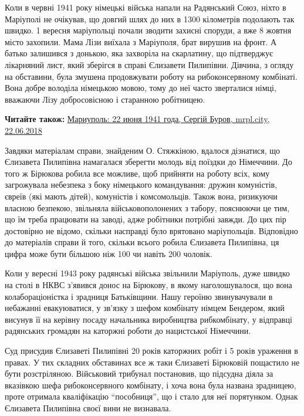 Коли в червні 1941 року німецькі війська напали на Радянський Союз, ніхто в
Маріуполі не очікував, що довгий шлях до них в 1300 кілометрів подолають так
швидко. 1 вересня маріупольці почали зводити захисні споруди, а вже 8 жовтня
місто захопили. Мама Лізи виїхала з Маріуполя, брат вирушив на фронт. А батько
залишився з донькою, яка захворіла на скарлатину, що підтверджує лікарняний
лист, який зберігся в справі Єлизавети Пилипівни. Дівчина, з огляду на
обставини, була змушена продовжувати роботу на рибоконсервному комбінаті. Вона
добре володіла німецькою мовою, тому до неї часто зверталися німці, вважаючи
Лізу добросовісною і старанною робітницею.

\textbf{Читайте також:} \href{https://mrpl.city/blogs/view/mariupol-22-iyunya-1941-goda}{%
Мариуполь: 22 июня 1941 года, Сергій Буров, mrpl.city, 22.06.2018}

Завдяки матеріалам справи, знайденим О. Стяжкіною, вдалося дізнатися, що
Єлизавета Пилипівна намагалася зберегти молодь від поїздки до Німеччини. До
того ж Бірюкова робила все можливе, щоб прийняти на роботу всіх, кому
загрожувала небезпека з боку німецького командування: дружин комуністів, євреїв
(які мають дітей), комуністів і комсомольців. Також вона, ризикуючи власною
безпекою, звільняла військовополонених з табору, пояснюючи це тим, що їм треба
працювати на заводі, адже робітники потрібні завжди. До цих пір достовірно не
відомо, скільки насправді було врятовано маріупольців. Відповідно до матеріалів
справи й того, скільки всього робила Єлизавета Пилипівна, ця цифра може бути
більшою ніж 100 чи навіть 200 чоловік.


Коли у вересні 1943 року радянські війська звільнили Маріуполь, дуже швидко на
столі в НКВС з'явився донос на Бірюкову, в якому наголошувалося, що вона
колабораціоністка і зрадниця Батьківщини. Нашу героїню звинувачували в
небажанні евакуюватися, у зв'язку з шефом комбінату німцем Бендером, який
висунув її на керівну посаду начальника виробництва рибкомбінату, у відправці
радянських громадян на каторжні роботи до нацистської Німеччини.


Суд присудив Єлизаветі Пилипівні 20 років каторжних робіт і 5 років ураження в
правах. У тих складних обставинах все ж таки Єлизаветі Бірюковій пощастило не
бути розстріляною. Військовий трибунал постановив, що підсудна діяла за
вказівкою шефа рибоконсервного комбінату, і хоча вона була названа зрадницею,
проте отримала кваліфікацію \enquote{пособниця}, що і стало для неї порятунком. Однак
Єлизавета Пилипівна своєї вини не визнавала.

